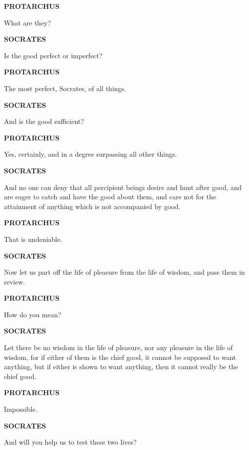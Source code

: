 \documentclass[11pt,letter]{article}
\begin{document}
\par \textbf{PROTARCHUS}
\par   What are they?

\par \textbf{SOCRATES}
\par   Is the good perfect or imperfect?

\par \textbf{PROTARCHUS}
\par   The most perfect, Socrates, of all things.

\par \textbf{SOCRATES}
\par   And is the good sufficient?

\par \textbf{PROTARCHUS}
\par   Yes, certainly, and in a degree surpassing all other things.

\par \textbf{SOCRATES}
\par   And no one can deny that all percipient beings desire and hunt after good, and are eager to catch and have the good about them, and care not for the attainment of anything which is not accompanied by good.

\par \textbf{PROTARCHUS}
\par   That is undeniable.

\par \textbf{SOCRATES}
\par   Now let us part off the life of pleasure from the life of wisdom, and pass them in review.

\par \textbf{PROTARCHUS}
\par   How do you mean?

\par \textbf{SOCRATES}
\par   Let there be no wisdom in the life of pleasure, nor any pleasure in the life of wisdom, for if either of them is the chief good, it cannot be supposed to want anything, but if either is shown to want anything, then it cannot really be the chief good.

\par \textbf{PROTARCHUS}
\par   Impossible.

\par \textbf{SOCRATES}
\par   And will you help us to test these two lives?
\end{document}
